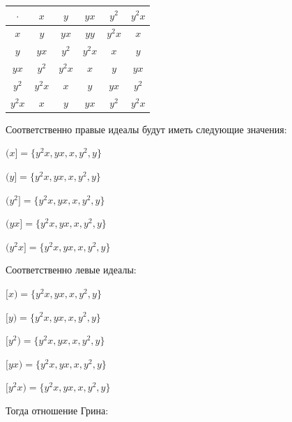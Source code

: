 \documentclass[spec, och, labwork]{shiza}
\begin{document}
     \begin{table}[H]
          \centering
          \begin{tabular}{|c|c|c|c|c|c|}
          \hline
          $\cdot $ & $x$ & $y$  & $yx$  & $y^2$ & $y^2x$ \\ \hline
          $x$      & $y$ & $yx$ & $yy$  & $y^2x$ & $x$ \\ \hline
          $y$      & $yx$ & $y^2$ & $y^2x$ & $x$ & $y$ \\ \hline
          $yx$     & $y^2$ & $y^2x$ & $x$ & $y$ & $yx$ \\ \hline
          $y^2$    & $y^2x$ & $x$ & $y$ & $yx$ & $y^2$ \\ \hline
          $y^2x$   & $x$ &  $y$  &  $yx$ & $y^2$ & $y^2x$ \\ \hline
          \end{tabular}
        \end{table}

      Соответственно правые идеалы будут иметь следующие значения:

      \begin{center}

        $(x] = \{y^2x, yx, x, y^2, y\}$

        $(y] = \{y^2x, yx, x, y^2, y\}$
  
        $(y^2] = \{y^2x, yx, x, y^2, y\}$
  
        $(yx] = \{y^2x, yx, x, y^2, y\}$
    
        $(y^2x] = \{y^2x, yx, x, y^2, y\}$

      \end{center}

      Соответственно левые идеалы:


      \begin{center}

        $[x) = \{y^2x, yx, x, y^2, y\}$

        $[y) = \{y^2x, yx, x, y^2, y\}$
  
        $[y^2) = \{y^2x, yx, x, y^2, y\}$
  
        $[yx) = \{y^2x, yx, x, y^2, y\}$
    
        $[y^2x) = \{y^2x, yx, x, y^2, y\}$

      \end{center}

      Тогда отношение Грина: 
\end{document}
